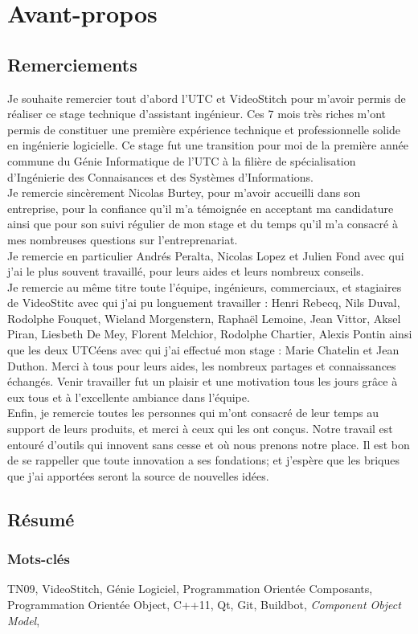 \chapter*{Avant-propos}

\section*{Remerciements}
Je souhaite remercier tout d'abord l'UTC et VideoStitch pour m'avoir permis de 
réaliser ce stage technique d'assistant ingénieur. Ces 7 mois très riches m'ont 
permis de constituer une première expérience technique et professionnelle solide 
en ingénierie logicielle. Ce stage fut une transition pour moi de la première 
année commune du Génie Informatique de l'UTC à la filière de spécialisation 
d'Ingénierie des Connaisances et des Systèmes d'Informations.\\
\newline
Je remercie sincèrement Nicolas Burtey, pour m'avoir accueilli dans son entreprise,
pour la confiance qu'il m'a témoignée en acceptant ma candidature ainsi que pour
son suivi régulier de mon stage et du temps qu'il m'a consacré à mes nombreuses
questions sur l'entreprenariat.\\
Je remercie en particulier Andrés Peralta, Nicolas Lopez et Julien Fond avec qui 
j'ai le plus souvent travaillé, pour leurs aides et leurs nombreux conseils.\\
Je remercie au même titre toute l'équipe, ingénieurs, commerciaux, et stagiaires 
de VideoStitc avec qui j'ai pu longuement travailler :
Henri Rebecq, Nils Duval, Rodolphe Fouquet, Wieland Morgenstern, Raphaël 
Lemoine, Jean Vittor, Aksel Piran, Liesbeth De Mey, Florent Melchior, Rodolphe 
Chartier, Alexis Pontin ainsi que les deux UTCéens avec qui j'ai effectué mon 
stage : Marie Chatelin et Jean Duthon. Merci à tous pour leurs aides, 
les nombreux partages et connaissances échangés. Venir travailler fut un plaisir 
et une motivation tous les jours grâce à eux tous et à l'excellente ambiance dans l'équipe.\\
\newline
Enfin, je remercie toutes les personnes qui m'ont consacré de leur temps au support 
de leurs produits, et merci à ceux qui les ont conçus. Notre travail est entouré 
d'outils qui innovent sans cesse et où nous prenons notre place. Il est bon de 
se rappeller que toute innovation a ses fondations; et j'espère que les briques 
que j'ai apportées seront la source de nouvelles idées.


\section*{Résumé}

\subsection*{Mots-clés}
TN09, VideoStitch, Génie Logiciel, Programmation Orientée Composants, 
Programmation Orientée Object, C++11, Qt, Git, Buildbot, \textit{Component Object Model},
